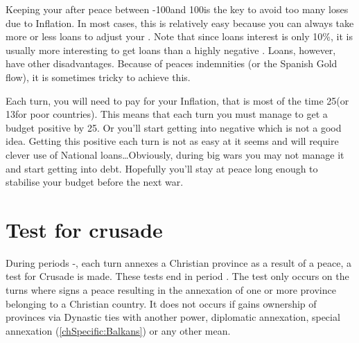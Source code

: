 \begin{playtip}
  Keeping your \RT after peace between -100\ducats and 100\ducats is the key
  to avoid too many loses due to Inflation. In most cases, this is relatively
  easy because you can always take more or less loans to adjust your \RT. Note
  that since loans interest is only 10\%, it is usually more interesting to
  get loans than a highly negative \RT. Loans, however, have other
  disadvantages. Because of peaces indemnities (or the Spanish Gold flow), it
  is sometimes tricky to achieve this.

  Each turn, you will need to pay for your Inflation, that is most of the time
  25\ducats (or 13\ducats for poor countries). This means that each turn you
  must manage to get a budget positive by 25\ducats. Or you'll start getting
  into negative \RT which is not a good idea. Getting this positive each turn
  is not as easy at it seems and will require clever use of National
  loans\ldots Obviously, during big wars you may not manage it and start
  getting into debt. Hopefully you'll stay at peace long enough to stabilise
  your budget before the next war. 
\end{playtip}

\section{Test for crusade}\label{chPeace:Crusade}
\aparag During periods -, each turn \TUR annexes a
Christian province as a result of a peace, a test for Crusade is made.
\bparag These tests end in period .
\bparag The test only occurs on the turns where \TUR signs a peace resulting
in the annexation of one or more province belonging to a Christian country. It
does not occurs if \TUR gains ownership of provinces via Dynastic ties with
another power, diplomatic annexation, special \regionBalkans annexation
(\ref{chSpecific:Balkans}) or any other mean.

